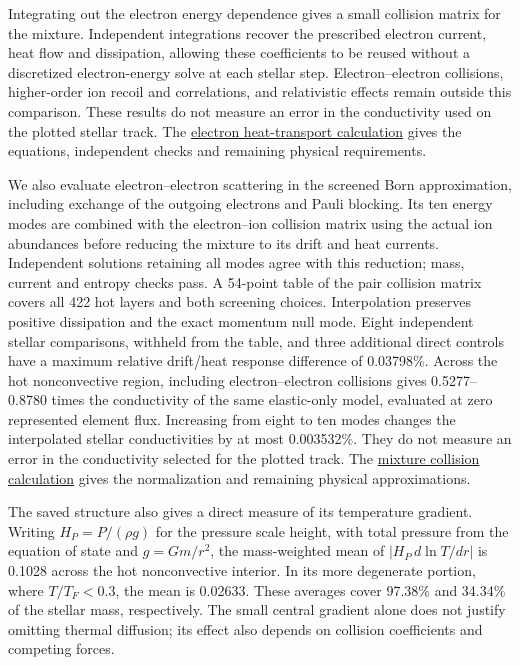 \documentclass[11pt,letterpaper]{article}
\newcommand{\doc}[2]{\href{https://github.com/oklo/ember/blob/codex/atmosphere5000-density-checks/#1}{#2}}
\begin{document}
Integrating out the electron energy dependence gives a small collision matrix
for the mixture. Independent integrations recover the prescribed electron
current, heat flow and dissipation, allowing these coefficients to be reused
without a discretized electron-energy solve at each stellar step.
Electron--electron collisions, higher-order ion recoil and correlations, and
relativistic effects remain outside this comparison. These results do not measure an error
in the conductivity used on the plotted stellar track.
The \doc{docs/DIFFUSION_ELECTRON_HEAT.md}{electron heat-transport calculation}
gives the equations, independent checks and remaining physical requirements.

We also evaluate electron--electron scattering in the screened Born
approximation, including exchange of the outgoing electrons and Pauli
blocking. Its ten energy modes are combined with the electron--ion collision
matrix using the actual ion abundances before reducing the mixture to its
drift and heat currents. Independent solutions retaining all modes agree
with this reduction; mass, current and entropy checks pass.
A 54-point table of the pair collision matrix covers all 422 hot layers and
both screening choices. Interpolation preserves positive dissipation and the
exact momentum null mode. Eight independent stellar comparisons, withheld
from the table, and three additional direct controls have a maximum relative
drift/heat response difference of 0.03798\%.
Across the hot nonconvective region, including electron--electron collisions
gives 0.5277--0.8780 times the conductivity of the same elastic-only model,
evaluated at zero represented element flux. Increasing from eight to ten
modes changes the interpolated stellar conductivities by at most 0.003532\%.
They do not measure an error in the conductivity selected for the plotted
track. The \doc{docs/ELECTRON_MIXTURE_COLLISIONS.md}{mixture collision calculation}
gives the normalization and remaining physical approximations.

\begin{samepage}
The saved structure also gives a direct measure of its temperature gradient.
Writing $H_P=P/(\rho g)$ for the pressure scale height, with total pressure
from the equation of state and $g=Gm/r^2$, the mass-weighted mean of
$|H_P\,d\ln T/dr|$ is 0.1028 across the hot nonconvective interior.
In its more degenerate portion, where $T/T_F<0.3$, the mean is 0.02633.
These averages cover 97.38\% and 34.34\% of the stellar mass, respectively.
The small central gradient alone does not justify omitting thermal diffusion;
its effect also depends on collision coefficients and competing forces.
\end{samepage}
\end{document}
